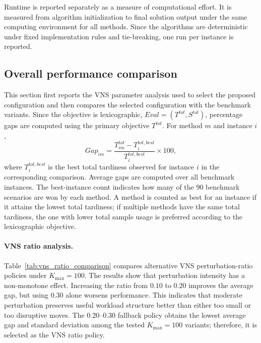 \documentclass[11pt]{article}
\begin{document}
Runtime is reported separately as a measure of computational effort. It is measured from algorithm initialization to final solution output under the same computing environment for all methods. Since the algorithms are deterministic under fixed implementation rules and tie-breaking, one run per instance is reported.
\subsection{Overall performance comparison}
\label{subsec:overall_results}

This section first reports the VNS parameter analysis used to select the proposed configuration and then compares the selected configuration with the benchmark variants. Since the objective is lexicographic, \(Eval=(T^{tot},S^{tot})\), percentage gaps are computed using the primary objective \(T^{tot}\). For method \(m\) and instance \(i\),
\[
Gap_{im} =
\frac{T^{tot}_{im} - T^{tot,best}_{i}}
     {T^{tot,best}_{i}}
\times 100,
\]
where \(T^{tot,best}_{i}\) is the best total tardiness observed for instance \(i\) in the corresponding comparison. Average gaps are computed over all benchmark instances. The best-instance count indicates how many of the 90 benchmark scenarios are won by each method. A method is counted as best for an instance if it attains the lowest total tardiness; if multiple methods have the same total tardiness, the one with lower total sample usage is preferred according to the lexicographic objective.

\paragraph{VNS ratio analysis.}
Table~\ref{tab:vns_ratio_comparison} compares alternative VNS perturbation-ratio policies under \(K_{\max}=100\). The results show that perturbation intensity has a non-monotone effect. Increasing the ratio from \(0.10\) to \(0.20\) improves the average gap, but using \(0.30\) alone worsens performance. This indicates that moderate perturbation preserves useful workload structure better than either too small or too disruptive moves. The \(0.20\)--\(0.30\) fallback policy obtains the lowest average gap and standard deviation among the tested \(K_{\max}=100\) variants; therefore, it is selected as the VNS ratio policy.
\end{document}
